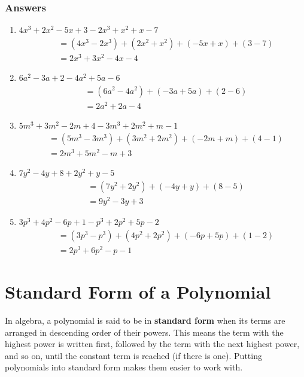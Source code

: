 \documentclass[12pt]{article}
\begin{document}
\subsubsection*{Answers}

\begin{enumerate}
    \item $4x^3 + 2x^2 - 5x + 3 - 2x^3 + x^2 + x - 7$
    \begin{align*}
    & = (4x^3 - 2x^3) + (2x^2 + x^2) + (-5x + x) + (3 - 7) \\
    & = 2x^3 + 3x^2 - 4x - 4
    \end{align*}
    
    \item $6a^2 - 3a + 2 - 4a^2 + 5a - 6$
    \begin{align*}
    & = (6a^2 - 4a^2) + (-3a + 5a) + (2 - 6) \\
    & = 2a^2 + 2a - 4
    \end{align*}
    
    \item $5m^3 + 3m^2 - 2m + 4 - 3m^3 + 2m^2 + m - 1$
    \begin{align*}
    & = (5m^3 - 3m^3) + (3m^2 + 2m^2) + (-2m + m) + (4 - 1) \\
    & = 2m^3 + 5m^2 - m + 3
    \end{align*}
    
    \item $7y^2 - 4y + 8 + 2y^2 + y - 5$
    \begin{align*}
    & = (7y^2 + 2y^2) + (-4y + y) + (8 - 5) \\
    & = 9y^2 - 3y + 3
    \end{align*}
    
    \item $3p^3 + 4p^2 - 6p + 1 - p^3 + 2p^2 + 5p - 2$
    \begin{align*}
    & = (3p^3 - p^3) + (4p^2 + 2p^2) + (-6p + 5p) + (1 - 2) \\
    & = 2p^3 + 6p^2 - p - 1
    \end{align*}
\end{enumerate}

\section*{Standard Form of a Polynomial}

In algebra, a polynomial is said to be in \textbf{standard form} when its terms are arranged in descending order of their powers. This means the term with the highest power is written first, followed by the term with the next highest power, and so on, until the constant term is reached (if there is one). Putting polynomials into standard form makes them easier to work with.\\
\end{document}
